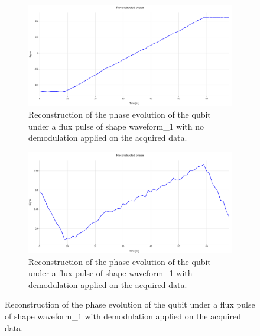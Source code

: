 \begin{figure}[h!]
    \centering
    \begin{subfigure}[t]{0.45\textwidth}
        \includegraphics[width=\textwidth]{figures/png/Cryoscope/no_demod/phase.png}
        \caption{Reconstruction of the phase evolution of the qubit under a flux pulse of shape waveform\_1 with no demodulation applied on the acquired data.}
        \label{fig:no_demodulation:step}
    \end{subfigure}
    \hfill
    \begin{subfigure}[t]{0.45\textwidth}
        \includegraphics[width=\textwidth]{figures/png/Cryoscope/demodulation/phase.png}
        \caption{Reconstruction of the phase evolution of the qubit under a flux pulse of shape waveform\_1 with demodulation applied on the acquired data.}
        \label{fig:demodulation:step}
    \end{subfigure}

    \vspace{0.5cm}


\end{figure}
